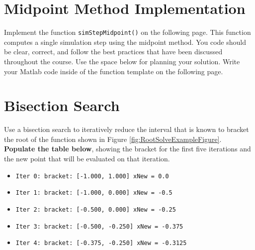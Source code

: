 
\section{Midpoint Method Implementation}

Implement the function \texttt{simStepMidpoint()} on the following page.
This function computes a single simulation step using the midpoint method.
You code should be clear, correct, and follow the best practices that
have been discussed throughout the course.
Use the space below for planning your solution.
Write your Matlab code inside of the function template on the following page.

\pagebreak
\lstset{stepnumber=0}




\pagebreak
\section{Bisection Search}
\begin{NoHyper}
Use a bisection search to iteratively reduce the interval that is known
to bracket the root of the function shown in Figure \ref{fig:RootSolveExampleFigure}.
\textbf{Populate the table below}, showing the bracket for the first five iterations
and the new point that will be evaluated on that iteration.
\end{NoHyper}
\begin{itemize}  \setlength\itemsep{0.3em}
  \item \texttt{Iter 0:   bracket: [-1.000,  \hspace{2.7em}  1.000]  \hspace{1em}  xNew = 0.0}
  \item \texttt{Iter 1:   bracket: [-1.000,  \hspace{2.7em}  0.000]  \hspace{1em}  xNew = -0.5}
  \item \texttt{Iter 2:   bracket: [-0.500,  \hspace{2.7em}  0.000]  \hspace{1em}  xNew = -0.25}
  \item \texttt{Iter 3:   bracket: [-0.500,  \hspace{2.7em} -0.250]  \hspace{1em}  xNew = -0.375}
  \item \texttt{Iter 4:   bracket: [-0.375,  \hspace{2.7em} -0.250]  \hspace{1em}  xNew = -0.3125}
\end{itemize}

